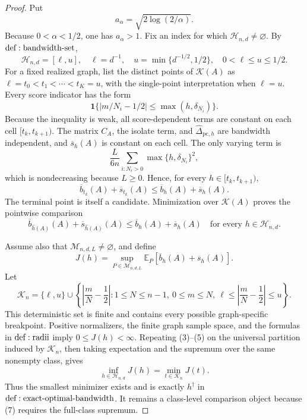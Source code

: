 \documentclass{article}
\begin{document}
\begin{proof}
Put
\[
 a_\alpha=\sqrt{2\log(2/\alpha)}.
\tag{1}
\]
Because \(0<\alpha<1/2\), one has \(a_\alpha>1\).  Fix an index for which \(\mathcal H_{n,d}\ne\varnothing\).  By \({\rm def:bandwidth\text{-}set}\),
\[
 \mathcal H_{n,d}=[\ell,u],\quad
 \ell=d^{-1},\quad u=\min\{d^{-1/2},1/2\},
 \quad0<\ell\leq u\leq1/2.
\tag{2}
\]
For a fixed realized graph, list the distinct points of \(\mathcal K(A)\) as \(\ell=t_0<t_1<\cdots<t_K=u\), with the single-point interpretation when \(\ell=u\).  Every score indicator has the form
\[
 \mathbf1\{|m/N_i-1/2|\leq\max(h,\delta_{N_i})\}.
\tag{3}
\]
Because the inequality is weak, all score-dependent terms are constant on each cell \([t_k,t_{k+1})\).  The matrix \(C_A\), the isolate term, and \(\widehat\Delta_{\mathrm{pc},h}\) are bandwidth independent, and \(\overline s_h(A)\) is constant on each cell.  The only varying term is
\[
 \frac{L}{6n}\sum_{i:N_i>0}\max\{h,\delta_{N_i}\}^2,
\tag{4}
\]
which is nondecreasing because \(L\geq0\).  Hence, for every \(h\in[t_k,t_{k+1})\),
\[
 \overline b_{t_k}(A)+\overline s_{t_k}(A)
 \leq\overline b_h(A)+\overline s_h(A).
\tag{5}
\]
The terminal point is itself a candidate.  Minimization over \(\mathcal K(A)\) proves the pointwise comparison
\[
 \overline b_{\widehat h(A)}(A)+\overline s_{\widehat h(A)}(A)
 \leq\overline b_h(A)+\overline s_h(A)
 \quad\text{for every }h\in\mathcal H_{n,d}.
\tag{6}
\]

Assume also that \(\mathcal M_{n,d,L}\ne\varnothing\), and define
\[
 J(h)=\sup_{P\in\mathcal M_{n,d,L}}
 \mathbb E_P[\overline b_h(A)+\overline s_h(A)].
\tag{7}
\]
Let
\[
 \mathcal K_n=\{\ell,u\}\cup
 \left\{\left|\frac mN-\frac12\right|:
 1\leq N\leq n-1,\ 0\leq m\leq N,\
 \ell\leq\left|\frac mN-\frac12\right|\leq u\right\}.
\tag{8}
\]
This deterministic set is finite and contains every possible graph-specific breakpoint.  Positive normalizers, the finite graph sample space, and the formulas in \({\rm def:radii}\) imply \(0\leq J(h)<\infty\).  Repeating (3)--(5) on the universal partition induced by \(\mathcal K_n\), then taking expectation and the supremum over the same nonempty class, gives
\[
 \inf_{h\in\mathcal H_{n,d}}J(h)=\min_{t\in\mathcal K_n}J(t).
\tag{9}
\]
Thus the smallest minimizer exists and is exactly \(h^\dagger\) in \({\rm def:exact\text{-}optimal\text{-}bandwidth}\).  It remains a class-level comparison object because (7) requires the full-class supremum.


\end{proof}
\end{document}
